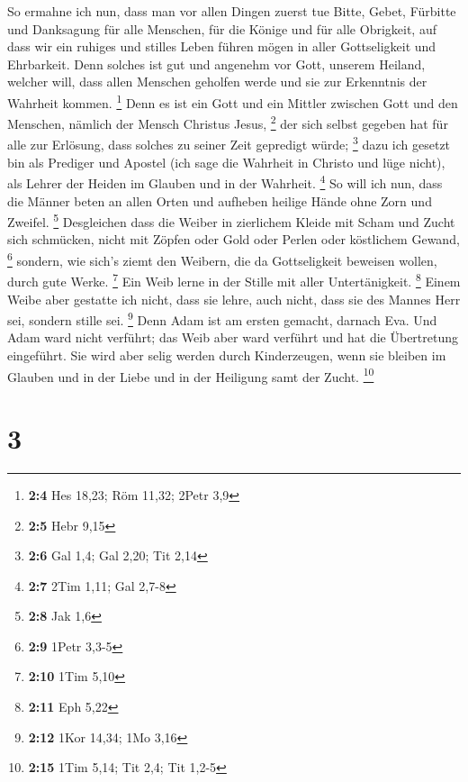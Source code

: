  So ermahne ich nun, dass man vor allen Dingen zuerst tue
Bitte, Gebet, Fürbitte und Danksagung für alle Menschen, 
für die Könige und für alle Obrigkeit, auf dass wir ein ruhiges und
stilles Leben führen mögen in aller Gottseligkeit und Ehrbarkeit.
 Denn solches ist gut und angenehm vor Gott, unserem
Heiland,  welcher will, dass allen Menschen geholfen werde
und sie zur Erkenntnis der Wahrheit kommen. \footnote{\textbf{2:4} Hes
  18,23; Röm 11,32; 2Petr 3,9}  Denn es ist ein Gott und
ein Mittler zwischen Gott und den Menschen, nämlich der Mensch Christus
Jesus, \footnote{\textbf{2:5} Hebr 9,15}  der sich selbst
gegeben hat für alle zur Erlösung, dass solches zu seiner Zeit gepredigt
würde; \footnote{\textbf{2:6} Gal 1,4; Gal 2,20; Tit 2,14}
 dazu ich gesetzt bin als Prediger und Apostel (ich sage
die Wahrheit in Christo und lüge nicht), als Lehrer der Heiden im
Glauben und in der Wahrheit. \footnote{\textbf{2:7} 2Tim 1,11; Gal 2,7-8}
 So will ich nun, dass die Männer beten an allen Orten und
aufheben heilige Hände ohne Zorn und Zweifel. \footnote{\textbf{2:8} Jak
  1,6}  Desgleichen dass die Weiber in zierlichem Kleide
mit Scham und Zucht sich schmücken, nicht mit Zöpfen oder Gold oder
Perlen oder köstlichem Gewand, \footnote{\textbf{2:9} 1Petr 3,3-5}
 sondern, wie sich's ziemt den Weibern, die da
Gottseligkeit beweisen wollen, durch gute Werke. \footnote{\textbf{2:10}
  1Tim 5,10}  Ein Weib lerne in der Stille mit aller
Untertänigkeit. \footnote{\textbf{2:11} Eph 5,22}  Einem
Weibe aber gestatte ich nicht, dass sie lehre, auch nicht, dass sie des
Mannes Herr sei, sondern stille sei. \footnote{\textbf{2:12} 1Kor 14,34;
  1Mo 3,16}  Denn Adam ist am ersten gemacht, darnach
Eva.  Und Adam ward nicht verführt; das Weib aber ward
verführt und hat die Übertretung eingeführt.  Sie wird
aber selig werden durch Kinderzeugen, wenn sie bleiben im Glauben und in
der Liebe und in der Heiligung samt der Zucht. \footnote{\textbf{2:15}
  1Tim 5,14; Tit 2,4; Tit 1,2-5}

\hypertarget{section-2}{%
\section{3}\label{section-2}}

